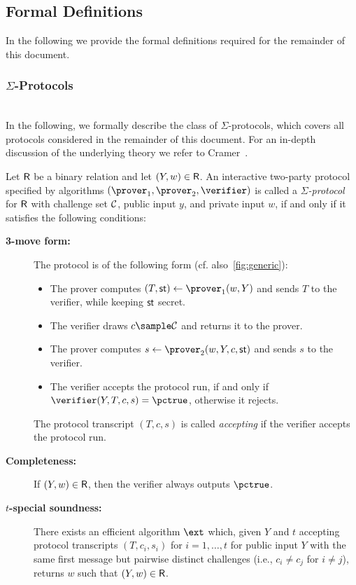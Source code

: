 \documentclass[runningheads]{llncs}
\begin{document}
\subsection{Formal Definitions}
  In the following we provide the formal definitions required for the remainder of this document.

\subsubsection{$\Sigma$-Protocols}~\\

In the following, we formally describe the class of $\Sigma$-protocols, which covers all protocols considered in the remainder of this document.
 For an in-depth discussion of the underlying theory we refer to Cramer~\cite{cramer97}.
\begin{definition}\label{def:sigma}
  Let $\mathsf{R}$ be a binary relation and let $(Y,w)\in\mathsf{R}$.
  An interactive two-party protocol specified by algorithms $(\prover_1,\prover_2,\verifier)$ is called a \emph{$\Sigma$-protocol} for $\mathsf{R}$ with challenge set $\mathcal{C}$, public input $y$, and private input $w$, if and only if it satisfies the following conditions:
  \begin{description}
    \item[\bf 3-move form:]
      The protocol is of the following form (cf. also~\cref{fig:generic}):
      \begin{itemize}
        \item
          The prover computes $(T,\st) \gets \prover_1(w,Y)$ and sends $T$ to the verifier, while keeping $\mathsf{st}$ secret.
        \item
          The verifier draws $c\sample\CS$ and returns it to the prover.
        \item
          The prover computes $s\gets\prover_2(w,Y,c,\st)$ and sends $s$ to the verifier.
        \item
          The verifier accepts the protocol run, if and only if $\verifier(Y, T,c,s)=\accept$, otherwise it rejects.
      \end{itemize}
      The protocol transcript $(T,c,s)$ is called \emph{accepting} if the verifier accepts the protocol run.
    \item[\bf Completeness:]
      If $(Y,w)\in\mathsf{R}$, then the verifier always outputs $\accept$.
    \item[\bf $t$-special soundness:]
      There exists an efficient algorithm $\ext$ which, given $Y$ and $t$ accepting protocol transcripts $(T,c_i,s_i)$ for $i=1,\dots,t$ for public input $Y$ with the same first message but pairwise distinct challenges (i.e., $c_i\ne c_j$ for $i\ne j$), returns $w$ such that $(Y,w)\in\mathsf{R}$.

\end{description}
\end{definition}
\end{document}

